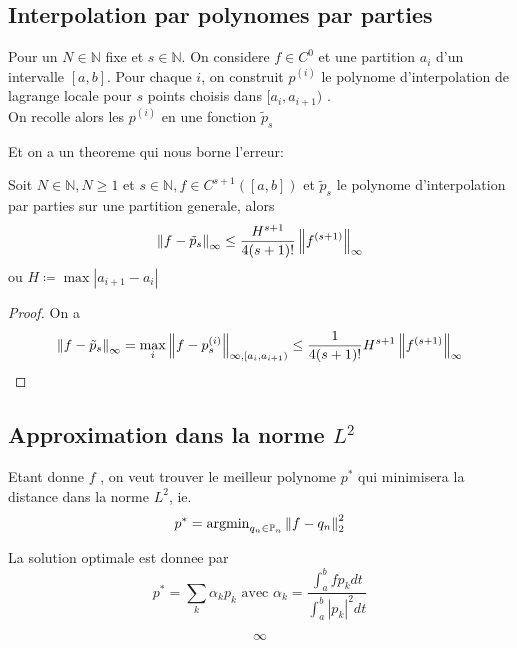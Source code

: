 \documentclass[../main.tex]{subfiles}
\begin{document}
\subsection{Interpolation par polynomes par parties}
\begin{defn}
	Pour un $N \in \mathbb{N}$ fixe et $s \in \mathbb{N}$. On considere $ f\in C^{0}$ et une partition $a_i$ d'un intervalle $ [ a,b] $. Pour chaque $ i$, on construit $p^{( i )}$  le polynome d'interpolation de lagrange locale pour $ s$ points choisis dans $ [ a_i, a_{i+1} ) $ .\\
	On recolle  alors les $ p^{( i) }$ en une fonction $ \tilde{p}_s$ 
\end{defn}
Et on a un theoreme qui nous borne l'erreur:
\begin{thm}
	Soit $ N \in \mathbb{N}, N \geq 1$ et $s\in \mathbb{N}, f \in C^{s+1}( [ a,b] ) $ et $ \tilde{p}_s$ le polynome d'interpolation par parties sur une partition generale, alors
	\[ 
	\left\lVert f - \tilde { p} _s\right\rVert _{ \infty } \leq  \frac{H^{s+1}}{4 ( s+1) !}\left\lVert f^{( s+1) }\right\rVert _{ \infty } 
	\]
	ou $ H \coloneqq  \max |a_{i+1} -a_i|$ 
\end{thm}
\begin{proof}
On a
\[ 
\left\lVert f- \tilde { p} _s\right\rVert _{ \infty } = \max_i \left\lVert f- p_s^{ ( i) }\right\rVert _{ \infty , [ a_i, a_{i+1} ) } \leq  \frac{1}{4 ( s+1) !} H^{s+1}\left\lVert f^{( s+1) }\right\rVert _{ \infty } 
\]

\end{proof}
\subsection{Approximation dans la norme $ L^{2}$ }
Etant donne $f$ , on veut trouver le meilleur polynome $ p^{\ast}$ qui minimisera la distance dans la norme $ L^{2}$, ie.
\[ 
	p^{\ast} = \mathrm{argmin}_{q_n \in \mathbb{P}_n} \left\lVert f- q_n\right\rVert _2^{2}
\]
\begin{thm}
	La solution optimale est donnee par
	\[ 
	p^{\ast} = \sum_k \alpha_k p_k \text{ avec } \alpha_k = \frac{ \int_{ a }^{ b }f p_k dt}{\int_{ a }^{ b }|p_k|^{2}dt}
	\]
		
\end{thm}

\[
  \infty 
\] 
\end{document}
